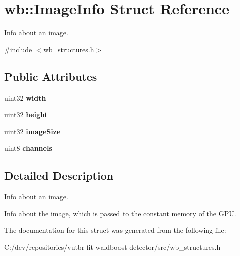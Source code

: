 \hypertarget{structwb_1_1_image_info}{}\section{wb\+:\+:Image\+Info Struct Reference}
\label{structwb_1_1_image_info}


Info about an image.  




{\ttfamily \#include $<$wb\+\_\+structures.\+h$>$}

\subsection*{Public Attributes}
\begin{DoxyCompactItemize}
\item 
\hypertarget{structwb_1_1_image_info_a629c5215481a56a39d3819ac70eb96fd}{}uint32 {\bfseries width}\label{structwb_1_1_image_info_a629c5215481a56a39d3819ac70eb96fd}

\item 
\hypertarget{structwb_1_1_image_info_a71583144f71c29cc52e41962bdda2064}{}uint32 {\bfseries height}\label{structwb_1_1_image_info_a71583144f71c29cc52e41962bdda2064}

\item 
\hypertarget{structwb_1_1_image_info_a91228be9269e2986a58659ce8834c9ab}{}uint32 {\bfseries image\+Size}\label{structwb_1_1_image_info_a91228be9269e2986a58659ce8834c9ab}

\item 
\hypertarget{structwb_1_1_image_info_a444f6eebaf1472a45df05657f05ed1e1}{}uint8 {\bfseries channels}\label{structwb_1_1_image_info_a444f6eebaf1472a45df05657f05ed1e1}

\end{DoxyCompactItemize}


\subsection{Detailed Description}
Info about an image. 

Info about the image, which is passed to the constant memory of the G\+P\+U. 

The documentation for this struct was generated from the following file\+:\begin{DoxyCompactItemize}
\item 
C\+:/dev/repositories/vutbr-\/fit-\/waldboost-\/detector/src/wb\+\_\+structures.\+h\end{DoxyCompactItemize}
